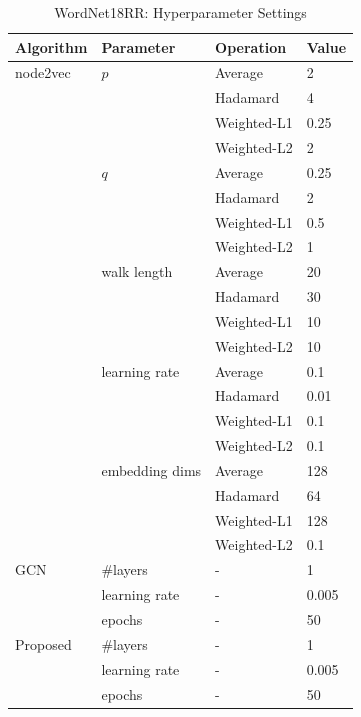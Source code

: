 \documentclass[sigconf]{acmart}
\begin{document}
\begin{table}[!ht]
    \centering
    \caption{WordNet18RR: Hyperparameter Settings}
    \label{tab:lp-hyper-2}
    \begin{tabular}{llll}
        \toprule
        \textbf{Algorithm} & \textbf{Parameter} & \textbf{Operation}& \textbf{Value}\\
        \midrule
        node2vec & $p$ & Average & 2\\
                 & & Hadamard & 4\\
                 & & Weighted-L1 & 0.25\\
                 & & Weighted-L2 & 2\\
                 & $q$ & Average & 0.25\\
                 & & Hadamard & 2\\
                 & & Weighted-L1 & 0.5\\
                 & & Weighted-L2 & 1\\
                 & walk length & Average & 20\\
                 & & Hadamard & 30\\
                 & & Weighted-L1 & 10\\
                 & & Weighted-L2 & 10\\
                 & learning rate & Average & 0.1\\
                 & & Hadamard & 0.01\\
                 & & Weighted-L1 & 0.1\\
                 & & Weighted-L2 & 0.1\\
                 & embedding dims & Average & 128\\
                 & & Hadamard & 64\\
                 & & Weighted-L1 & 128\\
                 & & Weighted-L2 & 0.1\\
        GCN & \#layers & - & 1\\
            & learning rate & - & 0.005\\
            & epochs & - & 50\\
        Proposed & \#layers & - & 1\\
                 & learning rate & - & 0.005\\
                 & epochs & - & 50\\
       \bottomrule
    \end{tabular}
\end{table}
\end{document}
